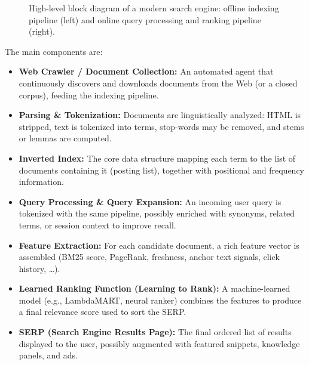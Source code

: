 \begin{figure}[htbp]
\caption{High-level block diagram of a modern search engine: offline indexing pipeline (left) and online query processing and ranking pipeline (right).}
\label{fig:arch-en}
\end{figure}

The main components are:

\begin{itemize}
    \item \textbf{Web Crawler / Document Collection:} An automated agent that continuously discovers and downloads documents from the Web (or a closed corpus), feeding the indexing pipeline.
    \item \textbf{Parsing \& Tokenization:} Documents are linguistically analyzed: HTML is stripped, text is tokenized into terms, stop-words may be removed, and stems or lemmas are computed.
    \item \textbf{Inverted Index:} The core data structure mapping each term to the list of documents containing it (posting list), together with positional and frequency information.
    \item \textbf{Query Processing \& Query Expansion:} An incoming user query is tokenized with the same pipeline, possibly enriched with synonyms, related terms, or session context to improve recall.
    \item \textbf{Feature Extraction:} For each candidate document, a rich feature vector is assembled (BM25 score, PageRank, freshness, anchor text signals, click history, \dots).
    \item \textbf{Learned Ranking Function (Learning to Rank):} A machine-learned model (e.g., LambdaMART, neural ranker) combines the features to produce a final relevance score used to sort the SERP.
    \item \textbf{SERP (Search Engine Results Page):} The final ordered list of results displayed to the user, possibly augmented with featured snippets, knowledge panels, and ads.
\end{itemize}

